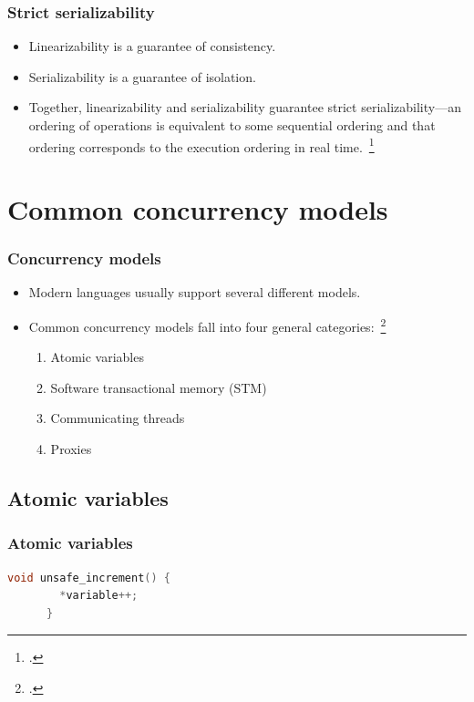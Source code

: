 \documentclass{beamer}
\begin{document}
  \begin{frame}
    \frametitle{Strict serializability}

    \begin{itemize}
      \item Linearizability is a guarantee of consistency.
      \item Serializability is a guarantee of isolation.
      \item Together, linearizability and serializability guarantee strict serializability---an ordering of operations is equivalent to some sequential ordering and that ordering corresponds to the execution ordering in real time.~\footcite{Herlihy1990}
    \end{itemize}
  \end{frame}

  \section{Common concurrency models}

  \begin{frame}
    \frametitle{Concurrency models}

    \begin{itemize}
      \item Modern languages usually support several different models.
      \item Common concurrency models fall into four general categories:~\footcite{Swalens2014}
      \begin{enumerate}
        \item Atomic variables
        \item Software transactional memory (STM)
        \item Communicating threads
        \item Proxies
      \end{enumerate}
    \end{itemize}
  \end{frame}

  \subsection{Atomic variables}

  \begin{frame}[fragile]
    \frametitle{Atomic variables}

    \begin{lstlisting}[basicstyle=\scriptsize\ttfamily,language=C]
      void unsafe_increment() {
        *variable++;
      }
    \end{lstlisting}
\end{frame}
\end{document}
